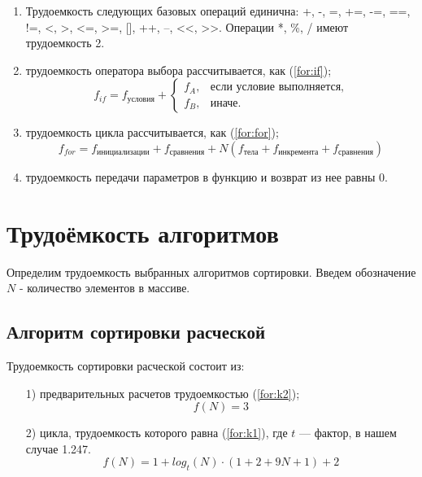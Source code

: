 \begin{enumerate}
	\item Трудоемкость следующих базовых операций единична:
	+, -, =, +=, -=, ==, !=, <, >, <=, >=, [], ++, --, <<, >>.
	Операции *, \%, / имеют трудоемкость 2.
	\item трудоемкость оператора выбора  рассчитывается, как (\ref{for:if});
	\begin{equation}
		\label{for:if}
		f_{if} = f_{\text{условия}} +
		\begin{cases}
			f_A, & \text{если условие выполняется,}\\
			f_B, & \text{иначе.}
		\end{cases}
	\end{equation}
	\item трудоемкость цикла рассчитывается, как (\ref{for:for});
	\begin{equation}
		\label{for:for}
		f_{for} = f_{\text{инициализации}} + f_{\text{сравнения}} + N(f_{\text{тела}} + f_{\text{инкремента}} + f_{\text{сравнения}})
	\end{equation}
	\item трудоемкость передачи параметров в функцию и возврат из нее равны 0.
\end{enumerate}


\section{Трудоёмкость алгоритмов}

Определим трудоемкость выбранных алгоритмов сортировки. Введем обозначение $N$ - количество элементов в массиве.

\subsection{Алгоритм сортировки расческой}

Трудоемкость сортировки расческой состоит из:
\begin{enumerate}
	\item[1)] предварительных расчетов трудоемкостью (\ref{for:k2});
	\begin{equation}
		\label{for:k2}
		f(N) = 3
	\end{equation}
	\item[2)] цикла, трудоемкость которого равна (\ref{for:k1}), где $t$ --- фактор, в нашем случае 1.247. 
	\begin{equation}
		\label{for:k1}
		f(N) = 1 + log_t(N) \cdot (1 + 2 + 9N + 1) + 2
	\end{equation}
\end{enumerate}

